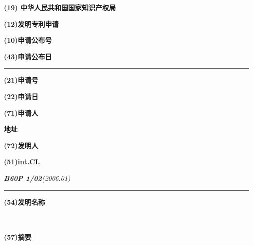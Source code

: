 \thispagestyle{empty}

\begin{flushleft}
    \textbf{{\Large(19) 中华人民共和国国家知识产权局}}
\end{flushleft}
\begin{center}
    \textbf{{\LARGE (12)发明专利申请}}
\end{center}

\begin{flushright}
    \begin{flushright}
        \textbf{(10)申请公布号}  \hspace{1}\applypublicnumber
    \end{flushright}

    \begin{flushright}
        \textbf{(43)申请公布日}  \hspace{1}\applypublicdate
    \end{flushright}
    \rule[18pt]{17.3cm}{0.1em}
\end{flushright}
\begin{flushleft}
    \textbf{(21)申请号 } \applynumber

    \textbf{(22)申请日} \hspace{1}\applydate

    \textbf{(71)申请人}\quad  \proposer

    \hspace{2.5em}\textbf{地址} \quad \authoraddress


    \textbf{(72)发明人}\quad \patentauthor

    \textbf{(51)int.CI.}

    \quad\quad\textit{\textbf{B60P 1/02}(2006.01)}
\end{flushleft}
\begin{flushright}
    \rule[16pt]{17.3cm}{0.1em}
\end{flushright}



\begin{multicols}{2}
    \begin{flushleft}
        \textbf{(54)发明名称}
    \end{flushleft}
    {\large  \name}\\
    \\
    \textbf{(57)摘要}

    \coverabstract
\end{multicols}
